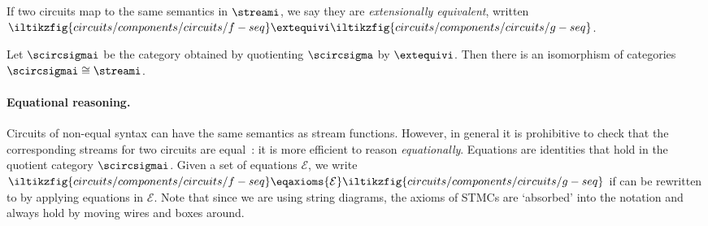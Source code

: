 \documentclass[10pt]{article}
\begin{document}
    \noindent
    If two circuits map to the same semantics in \(\streami\), we say they are \emph{extensionally equivalent}, written \(\iltikzfig{circuits/components/circuits/f-seq} \extequivi \iltikzfig{circuits/components/circuits/g-seq}\).

    \begin{theorem}
        Let \(\scircsigmai\) be the category obtained by quotienting \(\scircsigma\) by \(\extequivi\).
        Then there is an isomorphism of categories \(\scircsigmai \cong \streami\).
    \end{theorem}

    \paragraph*{Equational reasoning.}

    Circuits of non-equal syntax can have the same semantics as stream functions.
    However, in general it is prohibitive to check that the corresponding streams for two circuits are equal~\cite{ghica2017diagrammatica}: it is more efficient to reason \emph{equationally}.
    Equations are identities that hold in the quotient category \(\scircsigmai\).
    Given a set of equations \(\mathcal{E}\), we write \(\iltikzfig{circuits/components/circuits/f-seq} \eqaxioms{\mathcal{E}} \iltikzfig{circuits/components/circuits/g-seq}\) if  can be rewritten to  by applying equations in \(\mathcal{E}\).
    Note that since we are using string diagrams, the axioms of STMCs are `absorbed' into the notation and always hold by moving wires and boxes around.
\end{document}
